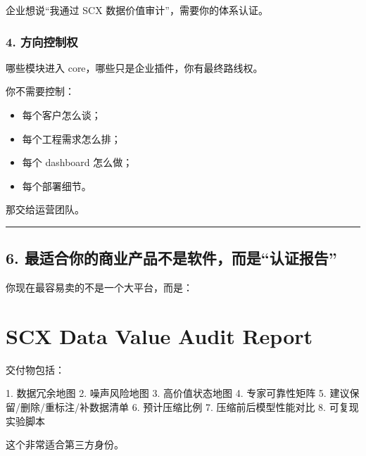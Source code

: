 \documentclass[
  12pt,
]{ctexart}
\newenvironment{Shaded}{}{}
\newcommand{\NormalTok}[1]{#1}
\providecommand{\tightlist}{%
  \setlength{\itemsep}{0pt}\setlength{\parskip}{0pt}}
\begin{document}
企业想说``我通过 SCX 数据价值审计''，需要你的体系认证。

\subsubsection{4. 方向控制权}\label{ux65b9ux5411ux63a7ux5236ux6743}

哪些模块进入 core，哪些只是企业插件，你有最终路线权。

你不需要控制：

\begin{itemize}
\tightlist
\item
  每个客户怎么谈；
\item
  每个工程需求怎么排；
\item
  每个 dashboard 怎么做；
\item
  每个部署细节。
\end{itemize}

那交给运营团队。

\begin{center}\rule{0.5\linewidth}{0.5pt}\end{center}

\subsection{6.
最适合你的商业产品不是软件，而是``认证报告''}\label{ux6700ux9002ux5408ux4f60ux7684ux5546ux4e1aux4ea7ux54c1ux4e0dux662fux8f6fux4ef6ux800cux662fux8ba4ux8bc1ux62a5ux544a}

你现在最容易卖的不是一个大平台，而是：

\section{\texorpdfstring{\textbf{SCX Data Value Audit
Report}}{SCX Data Value Audit Report}}\label{scx-data-value-audit-report}

交付物包括：

\begin{Shaded}
\begin{Highlighting}[]
\NormalTok{1. 数据冗余地图}
\NormalTok{2. 噪声风险地图}
\NormalTok{3. 高价值状态地图}
\NormalTok{4. 专家可靠性矩阵}
\NormalTok{5. 建议保留/删除/重标注/补数据清单}
\NormalTok{6. 预计压缩比例}
\NormalTok{7. 压缩前后模型性能对比}
\NormalTok{8. 可复现实验脚本}
\end{Highlighting}
\end{Shaded}

这个非常适合第三方身份。
\end{document}

